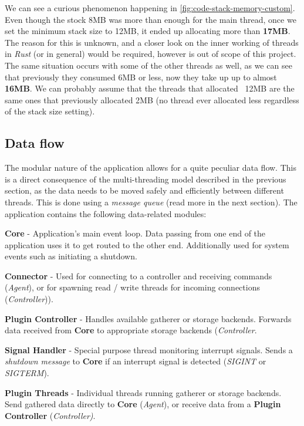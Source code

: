             We can see a curious phenomenon happening in \autoref{fig:code-stack-memory-custom}. Even though the stock 8MB was more than enough for the main thread, once we set the minimum stack size to 12MB, it ended up allocating more than \textbf{17MB}. The reason for this is unknown, and a closer look on the inner working of threads in \textit{Rust} (or in general) would be required, however is out of scope of this project. The same situation occurs with some of the other threads as well, as we can see that previously they consumed 6MB or less, now they take up up to almost \textbf{16MB}. We can probably assume that the threads that allocated ~12MB are the same ones that previously allocated 2MB (no thread ever allocated less regardless of the stack size setting).

            
    
    \subsection{Data flow}\label{sec:data-flow}
        The modular nature of the application allows for a quite peculiar data flow. This is a direct consequence of the multi-threading model described in the previous section, as the data needs to be moved safely and efficiently between different threads. This is done using a \textit{message queue} (read more in the next section). The application contains the following data-related modules:
        
        \textbf{Core} - Application's main event loop. Data passing from one end of the application uses it to get routed to the other end. Additionally used for system events such as initiating a shutdown.
        
        \textbf{Connector} - Used for connecting to a controller and receiving commands (\textit{Agent}), or for spawning read / write threads for incoming connections (\textit{Controller})).
        
        \textbf{Plugin Controller} - Handles available gatherer or storage backends. Forwards data received from \textbf{Core} to appropriate storage backends (\textit{Controller}.
        
        \textbf{Signal Handler} - Special purpose thread monitoring interrupt signals. Sends a \textit{shutdown message} to \textbf{Core} if an interrupt signal is detected (\textit{SIGINT} or \textit{SIGTERM}).
        
        \textbf{Plugin Threads} - Individual threads running gatherer or storage backends. Send gathered data directly to \textbf{Core} (\textit{Agent}), or receive data from a \textbf{Plugin Controller} (\textit{Controller)}.
        

